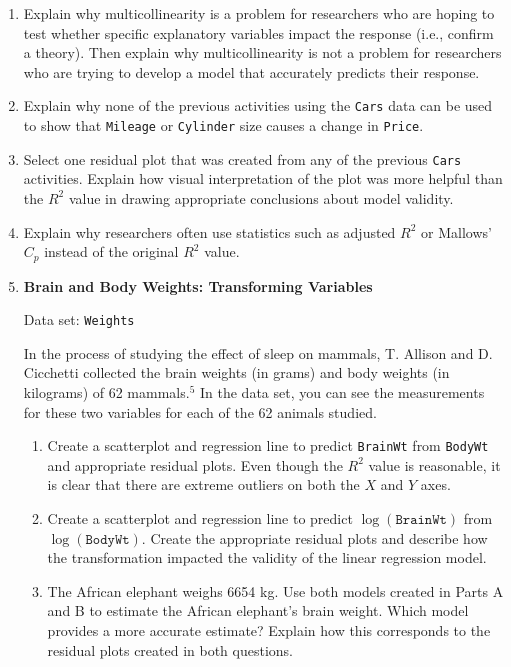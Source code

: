 \documentclass[
]{report}
\begin{document}
\begin{enumerate}
  \item Explain why multicollinearity is a problem for researchers who are hoping to test whether specific explanatory variables impact the response (i.e., confirm a theory). Then explain why multicollinearity is not a problem for researchers who are trying to develop a model that accurately predicts their response.

  \item Explain why none of the previous activities using the \texttt{Cars} data can be used to show that \texttt{Mileage} or \texttt{Cylinder} size causes a change in \texttt{Price}.

  \item Select one residual plot that was created from any of the previous \texttt{Cars} activities. Explain how visual interpretation of the plot was more helpful than the $\scriptstyle {R}^2$ value in drawing appropriate conclusions about model validity.

  \item Explain why researchers often use statistics such as adjusted $\scriptstyle {R}^2$ or Mallows’ $\scriptstyle C_p$ instead of the original $\scriptstyle {R}^2$ value.

  \item \textbf{Brain and Body Weights: Transforming Variables}

Data set: \texttt{Weights}

In the process of studying the effect of sleep on mammals, T. Allison and D. Cicchetti collected the brain weights (in grams) and body weights (in kilograms) of 62 mammals.$^5$ In the data set, you can see the measurements for these two variables for each of the 62 animals studied.

  \begin{enumerate}
    \item Create a scatterplot and regression line to predict \texttt{BrainWt} from \texttt{BodyWt} and appropriate residual plots. Even though the $\scriptstyle {R}^2$ value is reasonable, it is clear that there are extreme outliers on both the $\scriptstyle X$ and $\scriptstyle Y$ axes.
      \item Create a scatterplot and regression line to predict $\scriptstyle \log(\texttt{BrainWt})$ from $\scriptstyle \log(\texttt{BodyWt})$. Create the appropriate residual plots and describe how the transformation impacted the validity of the linear regression model.
      \item The African elephant weighs 6654 kg. Use both models created in Parts A and B to estimate the African elephant’s brain weight. Which model provides a more accurate estimate? Explain how this corresponds to the residual plots created in both questions.
    \end{enumerate}


\end{enumerate}
\end{document}
